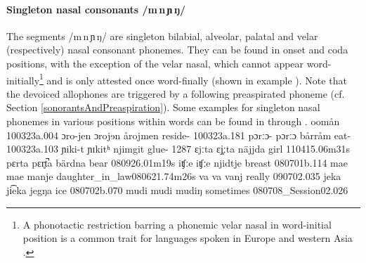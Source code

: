 \paragraph{Singleton nasal consonants /m\,n\,ɲ\,ŋ/}
The segments /m\,n\,ɲ\,ŋ/ are singleton bilabial, alveolar, palatal and velar (respectively) nasal consonant phonemes. 
They can be found in onset and coda positions, with the exception of the velar nasal, which cannot appear word-initially\footnote{A phonotactic restriction barring a phonemic velar nasal in word-initial position is a common trait for languages spoken in Europe and western Asia \citep[cf.][]{Anderson2008WALS}.} 
and is only attested once word-finally (shown in example ). 
Note that the devoiced allophones are triggered by a following preaspirated phoneme (cf. Section \ref{sonorantsAndPreaspiration}).
Some examples for singleton nasal phonemes in various positions within words can be found in  through .  
			{o}{o}{mån}	{}			{100323a}{.004}
		{ɔro-jen}	{ɔrojɘn}	{årojmen}	{reside-}		{100323a}{.181}
				{pɔrːɔ-\Bf{m}}	{pɔrːɔ}	{bårråm}	{eat-}			{100323a}{.103}
				{ɲi\Bf{m}ki-t}		{ɲɪkitʰ}	{njimgit}	{glue-}			{1287}
			{\Bf{n}ɛjːta}		{ɛj̥ːta}		{näjjda}	{girl\BS{}}		{110415}{.06m31s}
			{pɛrta}		{pɛr̥t̚a}		{bärdna}	{bear\BS{}}		{080926}{.01m19s}
		{iʧːe}		{iʧːe}		{njidtje}	{breast\BS{}}	{080701b}{.114}
	{mae}		{mae}		{manje}	{daughter\_in\_law\BS{}}{080621}{.74m26s}
				{va\Bf{ɲ}}		{va}		{vanj}	{really}					{090702}{.035}
			{jeka}		{ji͡eka}		{jegŋa}	{ice\BS{}}		{080702b}{.070}
	{mudi}		{mudi}		{mudiŋ}	{sometimes}			{080708\_Session02}{.026}%

